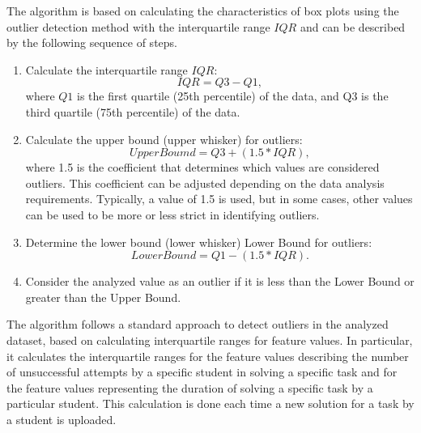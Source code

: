 \documentclass{article}
\begin{document}
\begin{multicols}{2}
\begin{justify}
      The algorithm is based on calculating the characteristics of box plots using the outlier detection method with the interquartile range $IQR$ and can be described by the following sequence of steps.

      \begin{enumerate}
        \item Calculate the interquartile range $IQR$:
        $$IQR = Q3 - Q1,$$
        where $Q1$ is the first quartile (25th percentile) of the data, and Q3 is the third quartile (75th percentile) of the data.
        \item Calculate the upper bound (upper whisker) for outliers:
        $$Upper Boumd = Q3 + (1.5 * IQR),$$
        where 1.5 is the coefficient that determines which values are considered outliers. This coefficient can be adjusted depending on the data analysis requirements. Typically, a value of 1.5 is used, but in some cases, other values can be used to be more or less strict in identifying outliers.
        \item Determine the lower bound (lower whisker) Lower Bound for outliers:
        $$Lower Bound=Q1-(1.5*IQR).$$
        \item Consider the analyzed value as an outlier if it is less than the Lower Bound or greater than the Upper Bound.
      \end{enumerate}
      
      The algorithm follows a standard approach to detect outliers in the analyzed dataset, based on calculating interquartile ranges for feature values. In particular, it calculates the interquartile ranges for the feature values describing the number of unsuccessful attempts by a specific student in solving a specific task and for the feature values representing the duration of solving a specific task by a particular student. This calculation is done each time a new solution for a task by a student is uploaded.


\end{justify}
\end{multicols}
\end{document}
